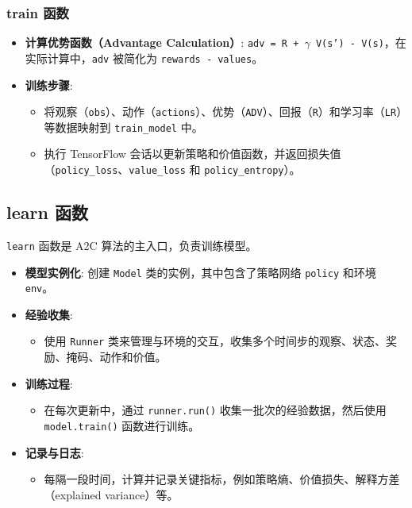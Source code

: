 \documentclass[twocolumn, 10pt]{article} %
\theoremstyle{remark}
\begin{document}
\subsubsection{train 函数}
\begin{itemize}
    \item \textbf{计算优势函数（Advantage Calculation）}: \texttt{adv = R + $\gamma$ V(s') - V(s)}，在实际计算中，\texttt{adv} 被简化为 \texttt{rewards - values}。
    \item \textbf{训练步骤}:
    \begin{itemize}
        \item 将观察（\texttt{obs}）、动作（\texttt{actions}）、优势（\texttt{ADV}）、回报（\texttt{R}）和学习率（\texttt{LR}）等数据映射到 \texttt{train\_model} 中。
        \item 执行 TensorFlow 会话以更新策略和价值函数，并返回损失值（\texttt{policy\_loss}、\texttt{value\_loss} 和 \texttt{policy\_entropy}）。
    \end{itemize}
\end{itemize}

\subsection{learn 函数}
\texttt{learn} 函数是 A2C 算法的主入口，负责训练模型。
\begin{itemize}
    \item \textbf{模型实例化}: 创建 \texttt{Model} 类的实例，其中包含了策略网络 \texttt{policy} 和环境 \texttt{env}。
    \item \textbf{经验收集}:
    \begin{itemize}
        \item 使用 \texttt{Runner} 类来管理与环境的交互，收集多个时间步的观察、状态、奖励、掩码、动作和价值。
    \end{itemize}
    \item \textbf{训练过程}:
    \begin{itemize}
        \item 在每次更新中，通过 \texttt{runner.run()} 收集一批次的经验数据，然后使用 \texttt{model.train()} 函数进行训练。
    \end{itemize}
    \item \textbf{记录与日志}:
    \begin{itemize}
        \item 每隔一段时间，计算并记录关键指标，例如策略熵、价值损失、解释方差（explained variance）等。
    \end{itemize}
\end{itemize}
\end{document}
